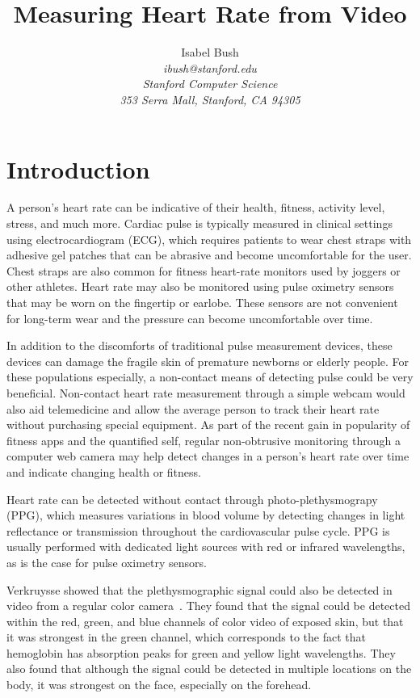 \documentclass[12pt,twocolumn,letterpaper]{article}
\begin{document}
\title{Measuring Heart Rate from Video}

\author{Isabel Bush\\
\it{ibush@stanford.edu}\\
Stanford Computer Science\\
353 Serra Mall, Stanford, CA 94305
}
\maketitle

\section*{Introduction}

A person's heart rate can be indicative of their health, fitness, activity level, stress, and much more. Cardiac pulse is typically measured in clinical settings using electrocardiogram (ECG), which requires patients to wear chest straps with adhesive gel patches that can be abrasive and become uncomfortable for the user. Chest straps are also common for fitness heart-rate monitors used by joggers or other athletes. Heart rate may also be monitored using pulse oximetry sensors that may be worn on the fingertip or earlobe. These sensors are not convenient for long-term wear and the pressure can become uncomfortable over time.

In addition to the discomforts of traditional pulse measurement devices, these devices can damage the fragile skin of premature newborns or elderly people. For these populations especially, a non-contact means of detecting pulse could be very beneficial. Non-contact heart rate measurement through a simple webcam would also aid telemedicine and allow the average person to track their heart rate without purchasing special equipment. As part of the recent gain in popularity of fitness apps and the quantified self, regular non-obtrusive monitoring through a computer web camera may help detect changes in a person's heart rate over time and indicate changing health or fitness. 

Heart rate can be detected without contact through photo-plethysmograpy (PPG), which measures variations in blood volume by detecting changes in light reflectance or transmission throughout the cardiovascular pulse cycle. PPG is usually performed with dedicated light sources with red or infrared wavelengths, as is the case for pulse oximetry sensors. 

Verkruysse \etal showed that the plethysmographic signal could also be detected in video from a regular color camera~\cite{Nelson:2008aa}. They found that the signal could be detected within the red, green, and blue channels of color video of exposed skin, but that it was strongest in the green channel, which corresponds to the fact that hemoglobin has absorption peaks for green and yellow light wavelengths. They also found that although the signal could be detected in multiple locations on the body, it was strongest on the face, especially on the forehead.
\end{document}
